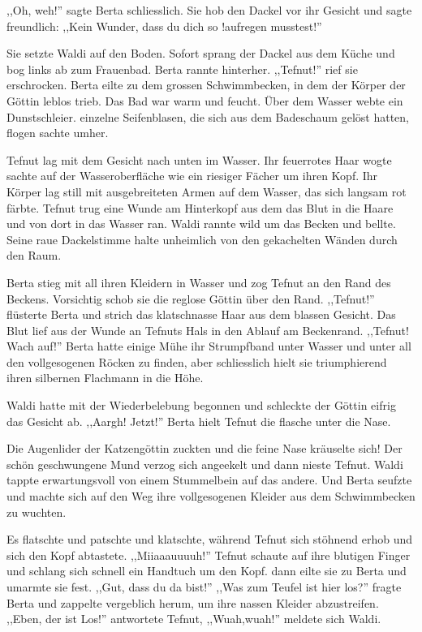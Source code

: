 ,,Oh, weh!'' sagte Berta schliesslich. Sie hob den Dackel vor ihr Gesicht und sagte freundlich: ,,Kein Wunder, dass du dich so !aufregen musstest!'' 

Sie setzte Waldi auf den Boden. Sofort sprang der Dackel aus dem Küche und bog links ab zum Frauenbad. Berta rannte hinterher. ,,Tefnut!'' rief sie erschrocken. Berta eilte zu dem grossen Schwimmbecken, in dem der Körper der Göttin leblos trieb. Das Bad war warm und feucht. Über dem Wasser webte ein Dunstschleier. einzelne Seifenblasen, die sich aus dem Badeschaum gelöst hatten, flogen sachte umher. 

Tefnut lag mit dem Gesicht nach unten im Wasser. Ihr feuerrotes Haar wogte sachte auf der Wasseroberfläche wie ein riesiger Fächer um ihren Kopf. Ihr Körper lag still mit ausgebreiteten Armen auf dem Wasser, das sich langsam rot färbte. Tefnut trug eine Wunde am Hinterkopf aus dem das Blut in die Haare und von dort in das Wasser ran. Waldi rannte wild um das Becken und bellte. Seine raue Dackelstimme halte unheimlich von den gekachelten Wänden durch den Raum. 

Berta stieg mit all ihren Kleidern in Wasser und zog Tefnut an den Rand des Beckens. Vorsichtig schob sie die reglose Göttin über den Rand. ,,Tefnut!'' flüsterte Berta und strich das klatschnasse Haar aus dem blassen Gesicht. Das Blut lief aus der Wunde an Tefnuts Hals in den Ablauf am Beckenrand. ,,Tefnut! Wach auf!'' Berta hatte einige Mühe ihr Strumpfband unter Wasser und unter all den vollgesogenen Röcken zu finden, aber schliesslich hielt sie triumphierend ihren silbernen Flachmann in die Höhe. 

Waldi hatte mit der Wiederbelebung begonnen und schleckte der Göttin eifrig das Gesicht ab. ,,Aargh! Jetzt!'' Berta hielt Tefnut die flasche unter die Nase. 

Die Augenlider der Katzengöttin zuckten und die feine Nase kräuselte sich! Der schön geschwungene Mund verzog sich angeekelt und dann nieste Tefnut. Waldi tappte erwartungsvoll von einem Stummelbein auf das andere. Und Berta seufzte und machte sich auf den Weg ihre vollgesogenen Kleider aus dem Schwimmbecken zu wuchten.

Es flatschte und patschte und klatschte, während Tefnut sich stöhnend erhob und sich den Kopf abtastete. ,,Miiaaauuuuh!'' Tefnut schaute auf ihre blutigen Finger und schlang sich schnell ein Handtuch um den Kopf. dann eilte sie zu Berta und umarmte sie fest. ,,Gut, dass du da bist!'' ,,Was zum Teufel ist hier los?'' fragte Berta und zappelte vergeblich herum, um ihre nassen Kleider abzustreifen. ,,Eben, der ist Los!'' antwortete Tefnut, ,,Wuah,wuah!'' meldete sich Waldi. 

